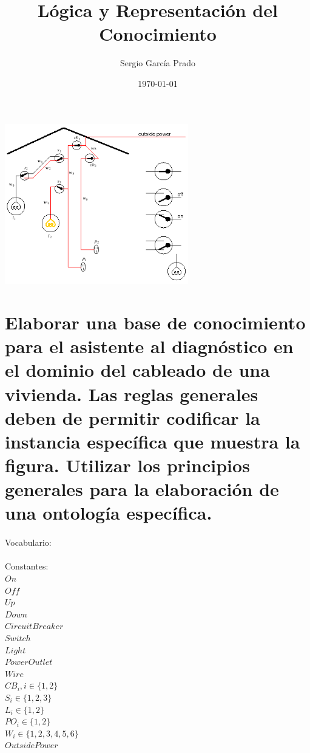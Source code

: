 \documentclass[10pt, a4paper,spanish]{article}
\title{\vspace{-15mm}\fontsize{24pt}{10pt}\selectfont\textbf{Lógica y Representación del Conocimiento}} %
\author{Sergio García Prado}
\date{\today}
\begin{document}
	\maketitle %

	\thispagestyle{fancy} %


	\begin{center}
		\includegraphics[width=0.6\textwidth]{diagnostic-assistant}
	\end{center}

	\section{Elaborar una base de conocimiento para el asistente al diagnóstico en el dominio del cableado de una vivienda. Las reglas generales deben de permitir codificar la instancia específica que muestra la figura. Utilizar los principios generales para la elaboración de una ontología específica.}


		\paragraph{}
		Vocabulario: \\

		\paragraph{}
		Constantes: \\
		$On$ \\
		$Off$ \\
		$Up$ \\
		$Down$ \\
		$CircuitBreaker$ \\
		$Switch$ \\
		$Light$ \\
		$PowerOutlet$ \\
		$Wire$ \\
		$CB_i, i \in \{1,2\}$ \\
		$S_i \in \{1,2,3\}$ \\
		$L_i \in \{1,2\}$ \\
		$PO_i \in \{1,2\}$ \\
		$W_i \in \{1,2,3,4,5,6\}$ \\
		$OutsidePower$ \\
\end{document}
